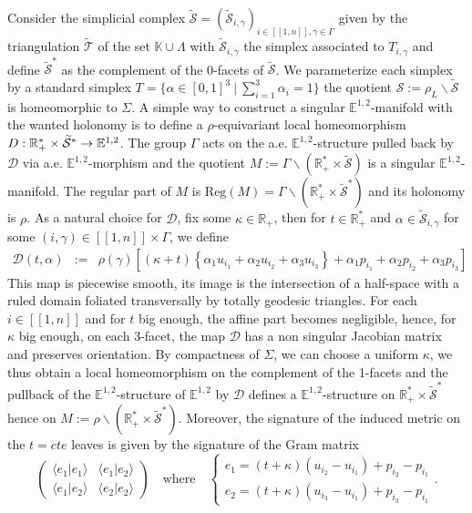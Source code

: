 \documentclass[a4paper,12pt]{article}
\def\D{\mathcal{D}}
\def\lsem{[\![}
\def\rsem{]\!]}
\def\R{\mathbb{R}}
\def\S{\mathcal S}
\def\S{\mathcal{S}}
\def\D{\mathcal{D}}
\def\RR{\mathbb{R}}
\newcommand{\mass}[1]{{\mathbb E}^{1,2}_{#1}}
\def\Reg{\mathrm{Reg}}
\def\Stilde{\widetilde{\mathcal S}}
\def\reg{\Reg}
\begin{document}
   
Consider the simplicial complex $\Stilde = \left(\Stilde_{i,\gamma}\right)_{i\in \lsem 1,n\rsem,\gamma\in \Gamma}$ given by the triangulation $\widetilde{\mathcal T}$ of the set $\mathbb K\cup \Lambda$ with $\Stilde_{i,\gamma}$ the simplex associated to $T_{i,\gamma}$ and define $\widetilde{\S}^*$ as the complement of the 0-facets of $\Stilde$. We parameterize each simplex by a standard simplex $T=\{\alpha\in [0,1]^3~|~\sum_{i=1}^3\alpha_i = 1\}$ the quotient $\S := \rho_L\backslash \Stilde$ is homeomorphic to $\Sigma$. A simple way to construct a singular $\mass{}$-manifold with the wanted holonomy is to define 
 a  $\rho$-equivariant local homeomorphism $\mathcal \D:  \R_+^*\times \Stilde^* \rightarrow \mass{}$. The group $\Gamma$  acts on the a.e. $\mass{}$-structure pulled back by $\D$ via a.e. $\mass{}$-morphism and the quotient $M:=\Gamma\backslash(\RR_+^*\times \Stilde)$ is a singular $\mass{}$-manifold. The regular part of $M$ is $\reg(M)=\Gamma\backslash(\RR_+^*\times \Stilde^*)$ and its holonomy is $\rho$.
 As a natural choice for $\D$, fix some $\kappa \in \RR_+$, then for  $ t\in \RR_+^*$ and $\alpha \in \Stilde_{i,\gamma}$ for some $(i,\gamma)\in\lsem1,n\rsem\times \Gamma$, we define 
 \begin{eqnarray*}
   \D(t,\alpha)& := &\rho(\gamma)\left[(\kappa+t)\left\{\alpha_1u_{i_1}+\alpha_2  u_{i_2}+\alpha_3u_{i_3}\right\}
  +\alpha_1 p_{i_1} + \alpha_2p_{i_2}+\alpha_3 p_{i_3}\right]
\end{eqnarray*}
This map is piecewise smooth, its image is the intersection of a half-space with a ruled domain foliated transversally by totally geodesic triangles. For each $i\in \lsem 1,n\rsem$ and  for $t$ big enough, the affine part becomes negligible, hence, for $\kappa$ big enough, on each 3-facet, the map $\D$ has a non singular Jacobian matrix and preserves orientation. By compactness of $\Sigma$, we can choose a uniform $\kappa$, we thus obtain a local homeomorphism on the complement of the 1-facets and the pullback of the $\mass{}$-structure of $\mass{}$ by $\D$ defines a $\mass{}$-structure on $\RR_+^*\times \Stilde^*$ hence on $M := \rho\backslash(\RR_+^*\times \Stilde^*)$.  Moreover, the signature of the induced metric on  the $t=cte$ leaves is given by the signature of the Gram  matrix $$ \begin{pmatrix} \langle e_1|e_1\rangle & \langle e_1|e_2\rangle \\ \langle e_1|e_2\rangle &\langle e_2|e_2\rangle \end{pmatrix}\quad \text{where} \quad \left\{ \begin{matrix} e_1 = (t+\kappa)(u_{i_2}-u_{i_1})+p_{i_2}-p_{i_1} \\  e_2 = (t+\kappa)(u_{i_3}-u_{i_1})+p_{i_3}-p_{i_1}  \end{matrix}\right. . $$
\end{document}
